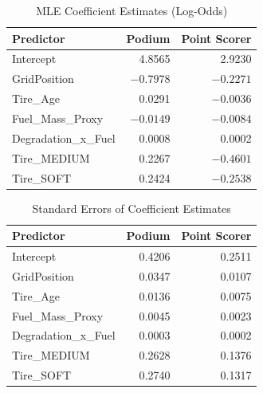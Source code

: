 \begin{table}[htbp]
  \centering
  \caption{MLE Coefficient Estimates (Log-Odds)}
  \label{tab:coefficients}
  \footnotesize
  \begin{tabularx}{0.88\textwidth}{>{\raggedright\arraybackslash}Xrr}
    \toprule
    \textbf{Predictor} & \textbf{Podium} & \textbf{Point Scorer} \\
    \midrule
    Intercept            &  4.8565  &  2.9230 \\
    GridPosition         & $-0.7978$ & $-0.2271$ \\
    Tire\_Age            &  0.0291  & $-0.0036$ \\
    Fuel\_Mass\_Proxy    & $-0.0149$ & $-0.0084$ \\
    Degradation\_x\_Fuel &  0.0008  &  0.0002 \\
    Tire\_MEDIUM         &  0.2267  & $-0.4601$ \\
    Tire\_SOFT           &  0.2424  & $-0.2538$ \\
    \bottomrule
  \end{tabularx}
\end{table}

\begin{table}[htbp]
  \centering
  \caption{Standard Errors of Coefficient Estimates}
  \label{tab:std-errors}
  \footnotesize
  \begin{tabularx}{0.88\textwidth}{>{\raggedright\arraybackslash}Xrr}
    \toprule
    \textbf{Predictor} & \textbf{Podium} & \textbf{Point Scorer} \\
    \midrule
    Intercept            & 0.4206  & 0.2511 \\
    GridPosition         & 0.0347  & 0.0107 \\
    Tire\_Age            & 0.0136  & 0.0075 \\
    Fuel\_Mass\_Proxy    & 0.0045  & 0.0023 \\
    Degradation\_x\_Fuel & 0.0003  & 0.0002 \\
    Tire\_MEDIUM         & 0.2628  & 0.1376 \\
    Tire\_SOFT           & 0.2740  & 0.1317 \\
    \bottomrule
  \end{tabularx}
\end{table}


